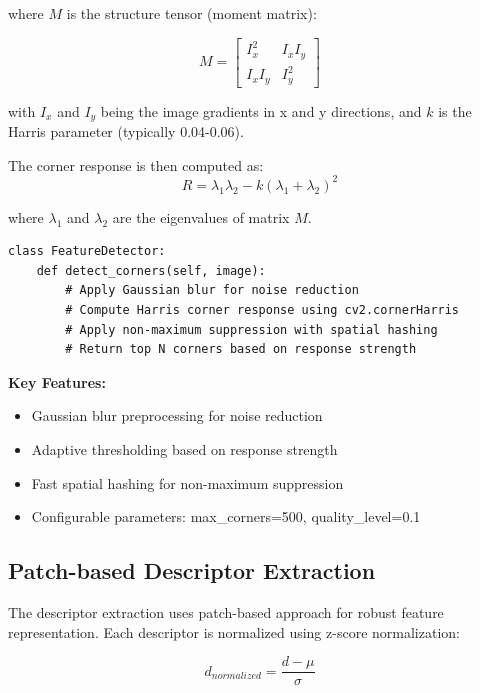 \documentclass[12pt,a4paper]{article}
\begin{document}
where $M$ is the structure tensor (moment matrix):

\begin{equation}
M = \begin{bmatrix}
I_x^2 & I_x I_y \\
I_x I_y & I_y^2
\end{bmatrix}
\end{equation}

with $I_x$ and $I_y$ being the image gradients in x and y directions, and $k$ is the Harris parameter (typically 0.04-0.06).

The corner response is then computed as:
\begin{equation}
R = \lambda_1 \lambda_2 - k(\lambda_1 + \lambda_2)^2
\end{equation}

where $\lambda_1$ and $\lambda_2$ are the eigenvalues of matrix $M$.

\begin{lstlisting}[caption=Harris Corner Detection Implementation]
class FeatureDetector:
    def detect_corners(self, image):
        # Apply Gaussian blur for noise reduction
        # Compute Harris corner response using cv2.cornerHarris
        # Apply non-maximum suppression with spatial hashing
        # Return top N corners based on response strength
\end{lstlisting}

\textbf{Key Features:}
\begin{itemize}
    \item Gaussian blur preprocessing for noise reduction
    \item Adaptive thresholding based on response strength
    \item Fast spatial hashing for non-maximum suppression
    \item Configurable parameters: max\_corners=500, quality\_level=0.1
\end{itemize}

\subsection{Patch-based Descriptor Extraction}

The descriptor extraction uses patch-based approach for robust feature representation. Each descriptor is normalized using z-score normalization:

\begin{equation}
d_{normalized} = \frac{d - \mu}{\sigma}
\end{equation}
\end{document}
